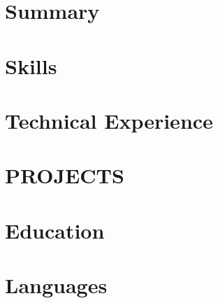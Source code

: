 \documentclass[10pt]{article}
\begin{document}
\pagestyle{others}\thispagestyle{first_page}

\section{Summary}


\section{Skills}


\section{Technical Experience}



\section{PROJECTS}


\section{Education}


\section{Languages}


%
\end{document}
